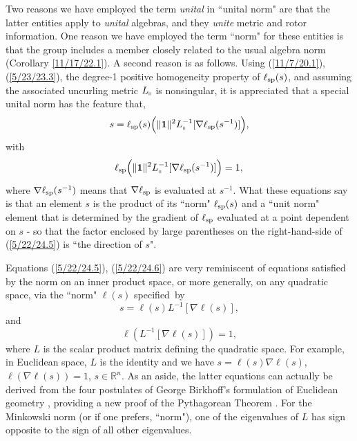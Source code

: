 \documentclass{amsart}
\numberwithin{equation}{section}
\theoremstyle{definition}
\numberwithin{theorem}{section}
\begin{document}
Two reasons we have employed the term {\it unital} in ``unital norm" are that the latter entities apply to {\it unital} algebras, and they {\it unite} metric and rotor information.  One reason we have employed the term ``norm" for these entities is that the group includes a member closely related to the usual algebra norm (Corollary \ref{11/17/22.1}).  A second reason is as follows.   Using (\ref{11/7/20.1}), (\ref{5/23/23.3}), the degree-1 positive homogeneity property of $\ell_{\rm sp}(s)$, and assuming the associated uncurling metric $L_{\shortparallel}$ is nonsingular, it is appreciated that a special unital norm has the feature that, 
\begin{equation}\label{5/22/24.5}  s = \ell_{\rm sp}(s)\Big(\|\mathbf{1}\|^2 L_{\shortparallel}^{-1}[\nabla\ell_{\rm sp}(s^{-1})]\Big),\end{equation} with
\begin{equation}\label{5/22/24.6}\ell_{\rm sp}\Big(\|\mathbf{1}\|^2 L_{\shortparallel}^{-1}[\nabla\ell_{\rm sp}(s^{-1})]\Big) = 1,\,\end{equation}
where $\nabla\ell_{\rm sp}(s^{-1})$ means that $\nabla\ell_{\rm sp}$ is evaluated at $s^{-1}$.  What these equations say is that an element $s$ is the product of its ``norm" $\ell_{\rm sp}(s)$ and a ``unit norm" element that is determined by the gradient of $\ell_{\rm sp}$ evaluated at a point dependent on $s$ - so that the factor enclosed by large parentheses on the right-hand-side of (\ref{5/22/24.5}) is  ``the direction of $s$".  

Equations (\ref{5/22/24.5}), (\ref{5/22/24.6}) are very reminiscent of equations satisfied by the norm on an inner product space, or more generally, on any quadratic space, via the ``norm" $\ell(s)$ \mbox{specified by} \begin{equation}\label{11/29/23.1} s = \ell(s)L^{-1}[\nabla\ell(s)],\end{equation} and \begin{equation}\label{11/29/23.2}\ell\left(L^{-1}[\nabla\ell(s)]\right) = 1,\end{equation} where $L$ is the scalar product matrix defining the quadratic space.  For example, in Euclidean space, $L$ is the identity and we have $s=\ell(s)\nabla \ell(s)$, $\ell\left(\nabla \ell(s)\right) = 1$, $s\in \mathbb{R}^n$.  As an aside, the latter equations can actually be derived from the four postulates of George Birkhoff's formulation of Euclidean geometry \cite{birkhoff:1932}, providing a new proof of the Pythagorean Theorem \cite{fgreensite:2022b}.  For the Minkowski norm (or if one prefers, ``norm"), one of the eigenvalues of $L$ has sign opposite to the sign of all other eigenvalues.
\end{document}

